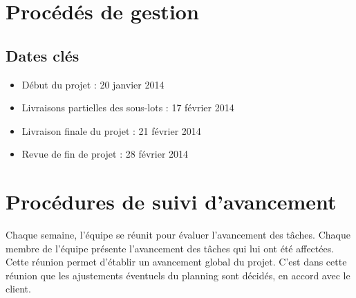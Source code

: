 \documentclass[a4paper,11pt,french]{article}
\begin{document}
\newpage
\section{Procédés de gestion}

\subsection{Dates clés}
\begin{itemize}
\item Début du projet : 20 janvier 2014
\item Livraisons partielles des sous-lots : 17 février 2014
\item Livraison finale du projet : 21 février 2014
\item Revue de fin de projet : 28 février 2014
\end{itemize}

\newpage
\section{Procédures de suivi d'avancement}

Chaque semaine, l'équipe se réunit pour évaluer l'avancement des tâches.
Chaque membre de l'équipe présente l'avancement des tâches qui lui ont été affectées.
Cette réunion permet d'établir un avancement global du projet.
C'est dans cette réunion que les ajustements éventuels du planning sont décidés, en accord avec le client.
\end{document}
